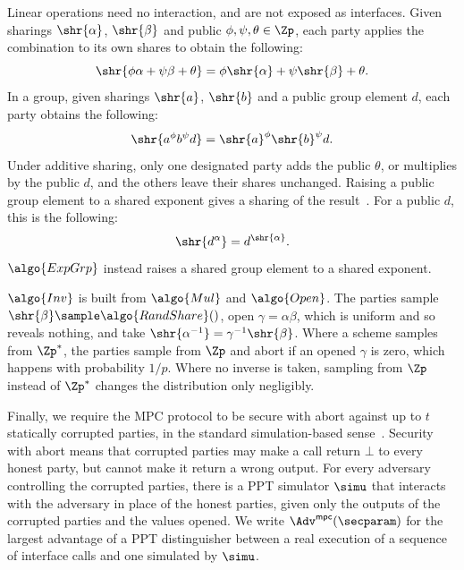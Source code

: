 Linear operations need no interaction, and are not exposed as interfaces. Given
sharings $\shr{\alpha}$, $\shr{\beta}$ and public $\phi, \psi, \theta \in \Zp$,
each party applies the combination to its own shares to obtain the following:
%
\begin{equation*}
%
  \shr{\phi\alpha + \psi\beta + \theta} = \phi\shr{\alpha} + \psi\shr{\beta} +
\theta.
%
\end{equation*}
%
In a group, given sharings $\shr{a}$, $\shr{b}$ and a public group element $d$,
each party obtains the following:
%
\begin{equation*}
%
  \shr{a^{\phi}b^{\psi}d} = \shr{a}^{\phi}\shr{b}^{\psi}d.
%
\end{equation*}
%
Under additive sharing, only one designated party adds the public $\theta$, or
multiplies by the public $d$, and the others leave their shares unchanged.
Raising a public group element to a shared exponent gives a
sharing of the result~\cite{LC:ADEO21}. For a public $d$, this is
the following:
%
\begin{equation*}
%
  \shr{d^{\alpha}} = d^{\shr{\alpha}}.
%
\end{equation*}
%
$\algo{ExpGrp}$ instead raises a shared group element to a shared exponent.

$\algo{Inv}$ is built from $\algo{Mul}$ and
$\algo{Open}$. The parties sample $\shr{\beta} \sample \algo{RandShare}()$, open
$\gamma = \alpha\beta$, which is uniform and so reveals nothing, and take
$\shr{\alpha^{-1}} = \gamma^{-1}\shr{\beta}$. Where a scheme samples from
$\Zp^*$, the parties sample from $\Zp$ and abort if an opened $\gamma$ is zero,
which happens with probability $1/p$. Where no inverse is taken, sampling from
$\Zp$ instead of $\Zp^*$ changes the distribution only negligibly.

Finally, we require the MPC protocol to be secure with abort against up to $t$
statically corrupted parties, in the standard simulation-based
sense~\cite{EPRINT:Lindell16}. Security with abort means that corrupted parties
may make a call return $\bot$ to every honest party, but cannot make it return
a wrong output. For every adversary controlling the corrupted parties, there is
a PPT simulator $\simu$ that interacts with the adversary in place of the honest
parties, given only the outputs of the corrupted parties and the values opened.
We write $\Adv^{\mathsf{mpc}}(\secparam)$ for the largest advantage of a PPT
distinguisher between a real execution of a sequence of interface calls and one
simulated by $\simu$.
